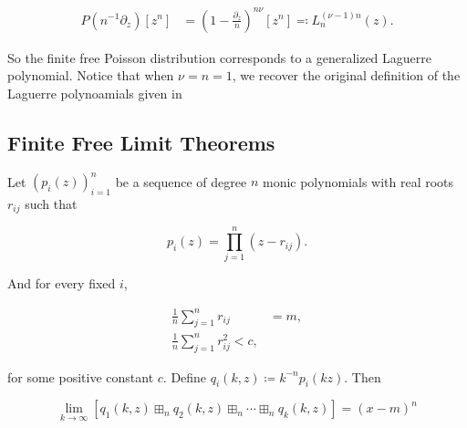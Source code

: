 \begin{align} \label{eq:ff_poisson}
    P(n^{-1}\partial_z)[z^n] &= \left( 1 - \frac{\partial_z}{n} \right)^{n\nu}[z^n] \eqcolon L_n^{(\nu-1)n}(z).
\end{align}

So the finite free Poisson distribution corresponds to a generalized Laguerre polynomial. Notice that when $\nu=n=1$, we recover the original definition of the Laguerre polynoamials given in 

\subsection{Finite Free Limit Theorems}

\begin{theorem}
    Let $(p_i(z))_{i=1}^n$ be a sequence of degree $n$ monic polynomials with real roots $r_{ij}$ such that

    \begin{equation*}
        p_i(z) = \prod_{j=1}^n (z - r_{ij}).
    \end{equation*}

    And for every fixed $i$,

    \begin{align*}
        \frac1n\sum_{j=1}^n r_{ij} &= m,\\
        \frac1n\sum_{j=1}^n r_{ij}^2 < c,
    \end{align*}

    \noindent for some positive constant $c$. Define $q_i(k,z) \coloneqq k^{-n}p_i(kz)$. Then

    \begin{equation*}
        \lim_{k\to \infty} [ q_1(k,z) \boxplus_n q_2(k,z) \boxplus_n \cdots \boxplus_n q_k(k,z) ] = (x-m)^n
    \end{equation*}
\end{theorem}

